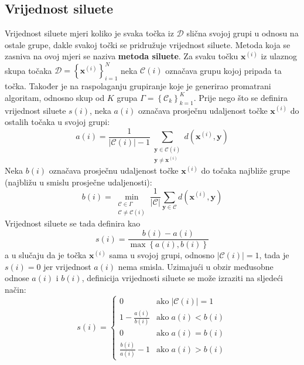 \documentclass[times, utf8, zavrsni]{fer}
\begin{document}
\subsection{Vrijednost siluete}
\label{subsec:silhouette}
Vrijednost siluete  mjeri koliko je svaka točka iz $\mathcal{D}$ slična svojoj grupi u odnosu na ostale grupe, dakle svakoj točki se pridružuje vrijednost siluete. Metoda koja se zasniva na ovoj mjeri se naziva \textbf{metoda siluete}. Za svaku točku $\mathbf{x}^{(i)}$ iz ulaznog skupa točaka $\mathcal{D} = \left\{\mathbf{x}^{(i)}\right\}_{i=1}^{N}$ neka $\mathcal{C} \left(i\right)$ označava grupu kojoj pripada ta točka. Također je na raspolaganju grupiranje koje je generirao promatrani algoritam, odnosno skup od $K$ grupa $\Gamma = \left\{\mathcal{C}_k\right\}_{k=1}^{K}$.
Prije nego što se definira vrijednost siluete $s (i)$,  neka $a (i)$ označava prosječnu udaljenost točke $\mathbf{x}^{(i)}$ do ostalih točaka u svojoj grupi:
\[a (i) = \frac{1}{\left\vert \mathcal{C} \left(i\right) \right\vert - 1} \sum_{\substack{\mathbf{y} \in \mathcal{C} \left(i\right) \\ \mathbf{y} \neq \mathbf{x}^{(i)}}} d \left(\mathbf{x}^{(i)}, \mathbf{y}\right)
\]
Neka $b (i)$ označava prosječnu udaljenost točke $\mathbf{x}^{(i)}$ do točaka najbliže grupe (najbližu u smislu prosječne udaljenosti):
\[b (i) = \min_{\substack{\mathcal{C} \in \Gamma \\ \mathcal{C} \neq \mathcal{C} \left(i\right)}} \frac{1}{\vert \mathcal{C} \vert} \sum_{\mathbf{y} \in \mathcal{C}}
d \left(\mathbf{x}^{(i)}, \mathbf{y}\right)\]
Vrijednost siluete se tada definira kao
\[s (i) = \frac{b (i) - a (i)}{\operatorname{max} \left\{a (i), b (i)\right\}}\]
a u slučaju da je točka $\mathbf{x}^{(i)}$ sama u svojoj grupi, odnosno $\left\vert \mathcal{C} \left(i\right) \right\vert = 1$, tada je $s (i) = 0$ jer vrijednost $a (i)$ nema smisla. Uzimajući u obzir međusobne odnose $a (i)$ i $b (i)$, definicija vrijednosti siluete se može izraziti na sljedeći način:
\[
s (i) = \begin{cases}
 0 & \text{ako} \; \left\vert \mathcal{C} \left(i\right) \right\vert = 1 \\
 1 - \frac{a (i)}{b (i)} & \text{ako} \; a (i) < b (i) \\  
 0 & \text{ako} \; a (i) = b (i) \\  
 \frac{b (i)}{a (i)} - 1 & \text{ako} \; a (i) > b(i)  
 \end{cases}
\]
\end{document}
